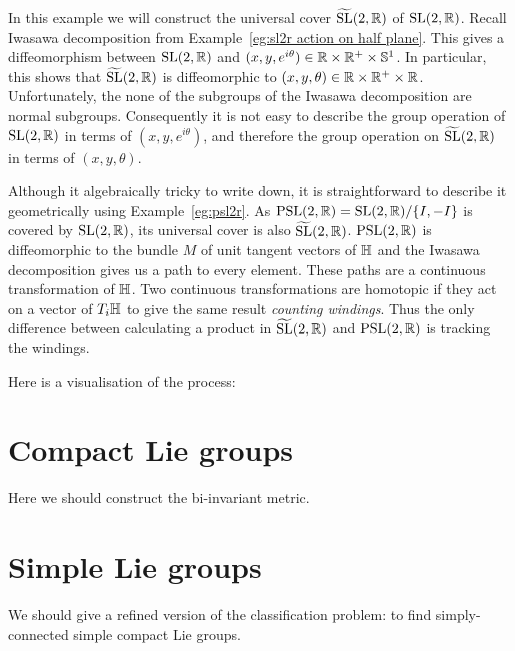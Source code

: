 \begin{example}
In this example we will construct the universal cover $\widetilde{\mathrm{SL}}(2,\mathbb{R})$ of $\mathrm{SL}(2,\mathbb{R})$.
Recall Iwasawa decomposition from Example~\ref{eg:sl2r action on half plane}.
This gives a diffeomorphism between $\mathrm{SL}(2,\mathbb{R})$ and $(x,y,e^{i\theta}) \in \mathbb{R} \times \mathbb{R}^+ \times \mathbb{S}^1$.
In particular, this shows that $\widetilde{\mathrm{SL}}(2,\mathbb{R})$ is diffeomorphic to $(x,y,\theta) \in \mathbb{R} \times \mathbb{R}^+ \times \mathbb{R}$.
Unfortunately, the none of the subgroups of the Iwasawa decomposition are normal subgroups.
Consequently it is not easy to describe the group operation of $\mathrm{SL}(2,\mathbb{R})$ in terms of $(x,y,e^{i\theta})$, and therefore the group operation on $\widetilde{\mathrm{SL}}(2,\mathbb{R})$ in terms of $(x,y,\theta)$.

Although it algebraically tricky to write down, it is straightforward to describe it geometrically using Example~\ref{eg:psl2r}.
As $\mathrm{PSL}(2,\mathbb{R}) = \mathrm{SL}(2,\mathbb{R})/\{I,-I\}$ is covered by $\mathrm{SL}(2,\mathbb{R})$, its universal cover is also $\widetilde{\mathrm{SL}}(2,\mathbb{R})$.
$\mathrm{PSL}(2,\mathbb{R})$ is diffeomorphic to the bundle $M$ of unit tangent vectors of $\mathbb{H}$ and the Iwasawa decomposition gives us a path to every element.
These paths are a continuous transformation of $\mathbb{H}$.
Two continuous transformations are homotopic if they act on a vector of $T_i\mathbb{H}$ to give the same result \emph{counting windings}.
Thus the only difference between calculating a product in $\widetilde{\mathrm{SL}}(2,\mathbb{R})$ and $\mathrm{PSL}(2,\mathbb{R})$ is tracking the windings.
\begin{webonly}
Here is a visualisation of the process:
\end{webonly}
\end{example}



\section{Compact Lie groups}

Here we should construct the bi-invariant metric.


\section{Simple Lie groups}
We should give a refined version of the classification problem: to find simply-connected simple compact Lie groups.
